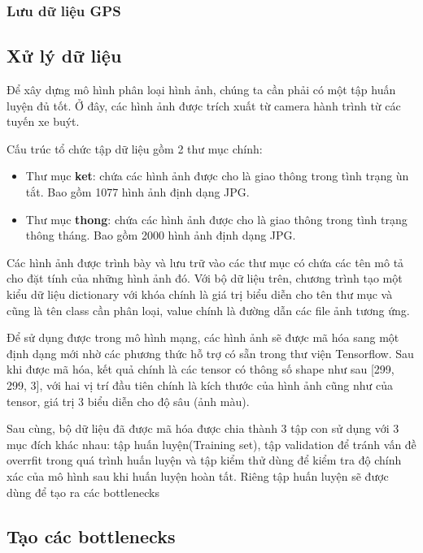 	
	
	\subsubsection{Lưu dữ liệu GPS }
	

	\subsection{Xử lý dữ liệu}
	
	Để xây dựng mô hình phân loại hình ảnh, chúng ta cần phải có một tập huấn luyện đủ tốt. Ở đây, các hình ảnh được trích xuất từ camera hành trình từ các tuyến xe buýt. \par
	Cấu trúc tổ chức tập dữ liệu gồm 2 thư mục chính:
	\begin{itemize}
		\item Thư mục \textbf{ket}: chứa các hình ảnh được cho là giao thông trong tình trạng ùn tắt. Bao gồm 1077 hình ảnh định dạng JPG.
		\item Thư mục \textbf{thong}: chứa các hình ảnh được cho là giao thông trong tình trạng thông tháng. Bao gồm 2000 hình ảnh định dạng JPG.
	\end{itemize}
	
		Các hình ảnh được trình bày và lưu trữ vào các thư mục có chứa các tên mô tả cho đặt tính của những hình ảnh đó. Với bộ dữ liệu trên, chương trình tạo một kiểu dữ liệu dictionary với khóa chính là giá trị biểu diễn cho tên thư mục và cũng là tên class cần phân loại, value chính là đường dẫn các file ảnh tương ứng.\par
		 Để sử dụng được trong mô hình mạng, các hình ảnh sẽ được mã hóa sang một định dạng mới nhờ các phương thức hỗ trợ có sẵn trong thư viện Tensorflow. Sau khi được mã hóa, kết quả chính là các tensor có thông số shape như sau [299, 299, 3], với hai vị trí đầu tiên chính là kích thước của hình ảnh cũng như của tensor, giá trị 3 biểu diễn cho độ sâu (ảnh màu).\par
	 	Sau cùng, bộ dữ liệu đã được mã hóa được chia thành 3 tập con sử dụng với 3 mục đích khác nhau: tập huấn luyện(Training set), tập validation để tránh vấn đề overrfit trong quá trình huấn luyện và tập kiểm thử dùng để kiểm tra độ chính xác của mô hình sau khi huấn luyện hoàn tất.	Riêng tập huấn luyện sẽ được dùng để tạo ra các bottlenecks
	
	\subsection{Tạo các bottlenecks}
	
